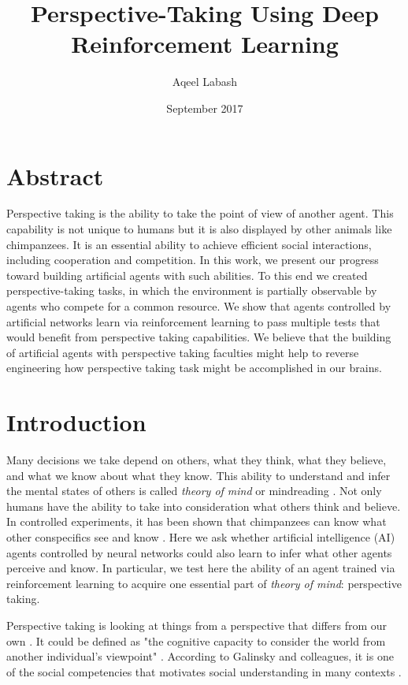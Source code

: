 \documentclass{article}
\title{Perspective-Taking Using Deep Reinforcement Learning}
\author{Aqeel Labash}
\date{September 2017}
\begin{document}
\maketitle
\section*{Abstract}
Perspective taking is the ability to take the point of view of another agent. This capability is not unique to humans but it is also displayed by other animals like chimpanzees. It is an essential ability to achieve efficient social interactions, including cooperation and competition. In this work, we present our progress toward building artificial agents with such abilities. To this end we created perspective-taking tasks, in which the environment is partially observable by agents who compete for a common resource. We show that agents controlled by artificial networks learn via reinforcement learning to pass multiple tests that would benefit from perspective taking capabilities. We believe that the building of artificial agents with perspective taking faculties might help to reverse engineering how perspective taking task might be accomplished in our brains.


\section{Introduction}
Many decisions we take depend on others, what they think, what they believe, and what we know about what they know. This ability to understand and infer the mental states of others is called \textit{theory of mind} \cite{premack1978does} or mindreading \cite{apperly2011mindreaders}. Not only humans have the ability to take into consideration what others think and believe. In controlled experiments, it has been shown that chimpanzees can know what other conspecifics see and know \cite{hare2000chimpanzees}. Here we ask whether artificial intelligence (AI) agents controlled by neural networks could also learn to infer what other agents perceive and know. In particular, we test here the ability of an agent trained via reinforcement learning to acquire one essential part of \textit{theory of mind}: perspective taking. 

Perspective taking is looking at things from a perspective that differs from our own \cite{ryskin2015perspective}. It could be defined as "the cognitive capacity to consider the world from another individual's viewpoint" \cite{davis1983measuring}. According to Galinsky and colleagues, it is one of the social competencies that motivates social understanding in many contexts \cite{galinsky2008pays}.
\end{document}
